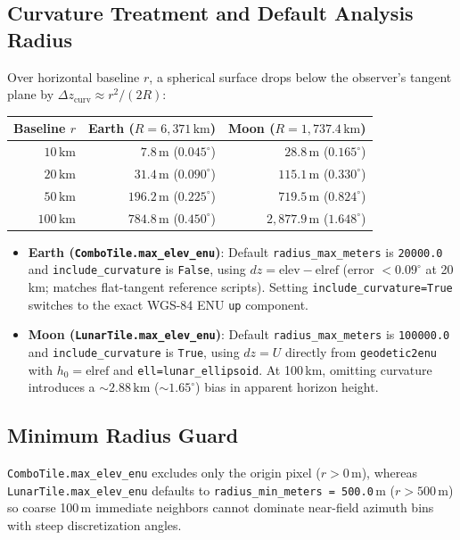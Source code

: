 \documentclass[11pt,letterpaper]{article}
\begin{document}
\subsection{Curvature Treatment and Default Analysis Radius}
Over horizontal baseline $r$, a spherical surface drops below the observer's tangent plane by $\Delta z_{\mathrm{curv}} \approx r^2 / (2R)$:
\begin{center}
\begin{tabular}{@{}rrr@{}}
\toprule
\textbf{Baseline $r$} & \textbf{Earth ($R = 6{,}371\,\text{km}$)} & \textbf{Moon ($R = 1{,}737.4\,\text{km}$)} \\
\midrule
$10\,\text{km}$ & $7.8\,\text{m}$ ($0.045^\circ$) & $28.8\,\text{m}$ ($0.165^\circ$) \\
$20\,\text{km}$ & $31.4\,\text{m}$ ($0.090^\circ$) & $115.1\,\text{m}$ ($0.330^\circ$) \\
$50\,\text{km}$ & $196.2\,\text{m}$ ($0.225^\circ$) & $719.5\,\text{m}$ ($0.824^\circ$) \\
$100\,\text{km}$ & $784.8\,\text{m}$ ($0.450^\circ$) & $2{,}877.9\,\text{m}$ ($1.648^\circ$) \\
\bottomrule
\end{tabular}
\end{center}
\begin{itemize}
  \item \textbf{Earth (\texttt{ComboTile.max\_elev\_enu})}: Default \texttt{radius\_max\_meters} is \texttt{20000.0} and \texttt{include\_curvature} is \texttt{False}, using $dz = \mathrm{elev} - \mathrm{elref}$ (error $< 0.09^\circ$ at 20\,km; matches flat-tangent reference scripts). Setting \texttt{include\_curvature=True} switches to the exact WGS-84 ENU \texttt{up} component.
  \item \textbf{Moon (\texttt{LunarTile.max\_elev\_enu})}: Default \texttt{radius\_max\_meters} is \texttt{100000.0} and \texttt{include\_curvature} is \texttt{True}, using $dz = U$ directly from \texttt{geodetic2enu} with $h_0=\mathrm{elref}$ and \texttt{ell=lunar\_ellipsoid}. At 100\,km, omitting curvature introduces a $\sim 2.88\,\text{km}$ ($\sim 1.65^\circ$) bias in apparent horizon height.
\end{itemize}

\subsection{Minimum Radius Guard}
\texttt{ComboTile.max\_elev\_enu} excludes only the origin pixel ($r > 0\,\text{m}$), whereas \texttt{LunarTile.max\_elev\_enu} defaults to \texttt{radius\_min\_meters = 500.0}\,m ($r > 500\,\text{m}$) so coarse 100\,m immediate neighbors cannot dominate near-field azimuth bins with steep discretization angles.
\end{document}
